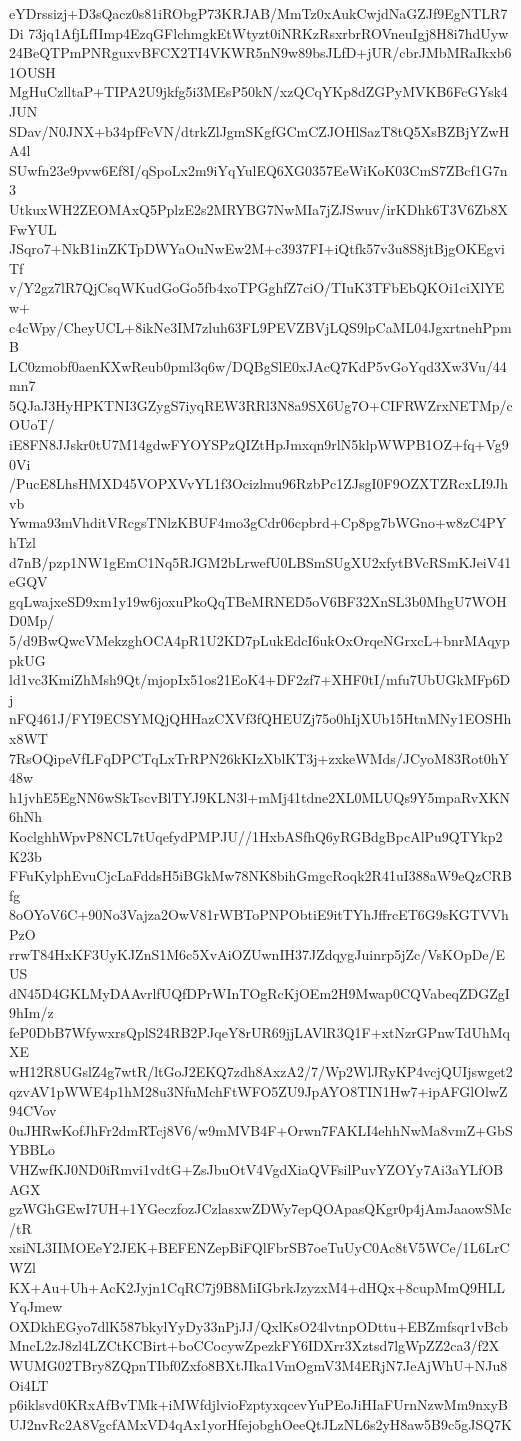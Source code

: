 eYDrssizj+D3sQacz0s81iRObgP73KRJAB/MmTz0xAukCwjdNaGZJf9EgNTLR7Di
73jq1AfjLfIImp4EzqGFlchmgkEtWtyzt0iNRKzRsxrbrROVneuIgj8H8i7hdUyw
24BeQTPmPNRguxvBFCX2TI4VKWR5nN9w89bsJLfD+jUR/cbrJMbMRaIkxb61OUSH
MgHuCzlltaP+TIPA2U9jkfg5i3MEsP50kN/xzQCqYKp8dZGPyMVKB6FcGYsk4JUN
SDav/N0JNX+b34pfFcVN/dtrkZlJgmSKgfGCmCZJOHlSazT8tQ5XsBZBjYZwHA4l
SUwfn23e9pvw6Ef8I/qSpoLx2m9iYqYulEQ6XG0357EeWiKoK03CmS7ZBcf1G7n3
UtkuxWH2ZEOMAxQ5PplzE2s2MRYBG7NwMIa7jZJSwuv/irKDhk6T3V6Zb8XFwYUL
JSqro7+NkB1inZKTpDWYaOuNwEw2M+c3937FI+iQtfk57v3u8S8jtBjgOKEgviTf
v/Y2gz7lR7QjCsqWKudGoGo5fb4xoTPGghfZ7ciO/TIuK3TFbEbQKOi1ciXlYEw+
c4cWpy/CheyUCL+8ikNe3IM7zluh63FL9PEVZBVjLQS9lpCaML04JgxrtnehPpmB
LC0zmobf0aenKXwReub0pml3q6w/DQBgSlE0xJAcQ7KdP5vGoYqd3Xw3Vu/44mn7
5QJaJ3HyHPKTNI3GZygS7iyqREW3RRl3N8a9SX6Ug7O+CIFRWZrxNETMp/cOUoT/
iE8FN8JJskr0tU7M14gdwFYOYSPzQIZtHpJmxqn9rlN5klpWWPB1OZ+fq+Vg90Vi
/PucE8LhsHMXD45VOPXVvYL1f3Ocizlmu96RzbPc1ZJsgI0F9OZXTZRcxLI9Jhvb
Ywma93mVhditVRcgsTNlzKBUF4mo3gCdr06cpbrd+Cp8pg7bWGno+w8zC4PYhTzl
d7nB/pzp1NW1gEmC1Nq5RJGM2bLrwefU0LBSmSUgXU2xfytBVcRSmKJeiV41eGQV
gqLwajxeSD9xm1y19w6joxuPkoQqTBeMRNED5oV6BF32XnSL3b0MhgU7WOHD0Mp/
5/d9BwQwcVMekzghOCA4pR1U2KD7pLukEdcI6ukOxOrqeNGrxcL+bnrMAqyppkUG
ld1vc3KmiZhMsh9Qt/mjopIx51os21EoK4+DF2zf7+XHF0tI/mfu7UbUGkMFp6Dj
nFQ461J/FYI9ECSYMQjQHHazCXVf3fQHEUZj75o0hIjXUb15HtnMNy1EOSHhx8WT
7RsOQipeVfLFqDPCTqLxTrRPN26kKIzXblKT3j+zxkeWMds/JCyoM83Rot0hY48w
h1jvhE5EgNN6wSkTscvBlTYJ9KLN3l+mMj41tdne2XL0MLUQs9Y5mpaRvXKN6hNh
KoclghhWpvP8NCL7tUqefydPMPJU//1HxbASfhQ6yRGBdgBpcAlPu9QTYkp2K23b
FFuKylphEvuCjcLaFddsH5iBGkMw78NK8bihGmgcRoqk2R41uI388aW9eQzCRBfg
8oOYoV6C+90No3Vajza2OwV81rWBToPNPObtiE9itTYhJffrcET6G9sKGTVVhPzO
rrwT84HxKF3UyKJZnS1M6c5XvAiOZUwnIH37JZdqygJuinrp5jZc/VsKOpDe/EUS
dN45D4GKLMyDAAvrlfUQfDPrWInTOgRcKjOEm2H9Mwap0CQVabeqZDGZgI9hIm/z
feP0DbB7WfywxrsQplS24RB2PJqeY8rUR69jjLAVlR3Q1F+xtNzrGPnwTdUhMqXE
wH12R8UGslZ4g7wtR/ltGoJ2EKQ7zdh8AxzA2/7/Wp2WlJRyKP4vcjQUIjswget2
qzvAV1pWWE4p1hM28u3NfuMchFtWFO5ZU9JpAYO8TIN1Hw7+ipAFGlOlwZ94CVov
0uJHRwKofJhFr2dmRTcj8V6/w9mMVB4F+Orwn7FAKLI4ehhNwMa8vmZ+GbSYBBLo
VHZwfKJ0ND0iRmvi1vdtG+ZsJbuOtV4VgdXiaQVFsilPuvYZOYy7Ai3aYLfOBAGX
gzWGhGEwI7UH+1YGeczfozJCzlasxwZDWy7epQOApasQKgr0p4jAmJaaowSMc/tR
xsiNL3IIMOEeY2JEK+BEFENZepBiFQlFbrSB7oeTuUyC0Ac8tV5WCe/1L6LrCWZl
KX+Au+Uh+AcK2Jyjn1CqRC7j9B8MiIGbrkJzyzxM4+dHQx+8cupMmQ9HLLYqJmew
OXDkhEGyo7dlK587bkylYyDy33nPjJJ/QxlKsO24lvtnpODttu+EBZmfsqr1vBcb
MncL2zJ8zl4LZCtKCBirt+boCCocywZpezkFY6IDXrr3Xztsd7lgWpZZ2ca3/f2X
WUMG02TBry8ZQpnTIbf0Zxfo8BXtJIka1VmOgmV3M4ERjN7JeAjWhU+NJu8Oi4LT
p6iklsvd0KRxAfBvTMk+iMWfdjlvioFzptyxqcevYuPEoJiHIaFUrnNzwMm9nxyB
UJ2nvRc2A8VgcfAMxVD4qAx1yorHfejobghOeeQtJLzNL6s2yH8aw5B9c5gJSQ7K
